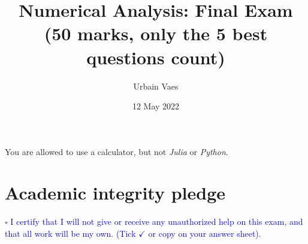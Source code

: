 \documentclass[11pt]{article}
\theoremstyle{definition}
\theoremstyle{remark}
\theoremstyle{plain}%
\begin{document}
\title{Numerical Analysis: Final Exam \\
\small{(\textbf{50 marks}, only the 5 best questions count)}}
\author{Urbain Vaes}
\date{12 May 2022}
\maketitle

\noindent You are allowed to use a calculator, but not \emph{Julia} or \emph{Python}.

\section*{Academic integrity pledge}
\noindent $\square$ \textcolor{blue}{I certify that I will not give or receive any unauthorized help on this exam, 
and that all work will be my own. (Tick $\checkmark$ or copy on your answer sheet)}.
\end{document}
